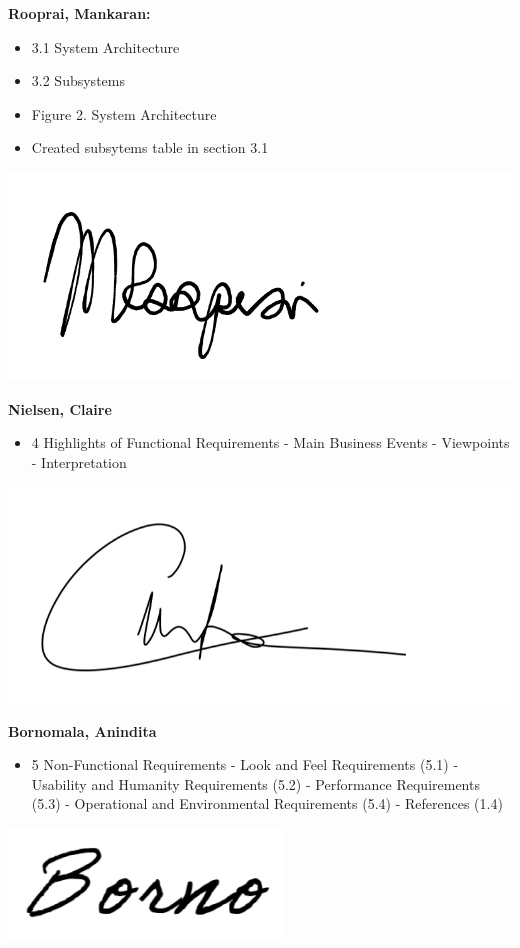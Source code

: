 \documentclass[]{article}
\begin{document}
\textbf{Rooprai, Mankaran:}
\begin{itemize}
	\item 3.1 System Architecture
	\item 3.2 Subsystems
	\item Figure 2. System Architecture
	\item Created subsytems table in section 3.1
\end{itemize}
\includegraphics[scale=0.15]{mankaransignature.png}

\textbf{Nielsen, Claire}
\begin{itemize}
        \item 4 Highlights of Functional Requirements
            \subitem - Main Business Events
            \subitem - Viewpoints
            \subitem - Interpretation
\end{itemize}
\includegraphics[scale=0.15]{clairesignature.jpg}

\textbf{Bornomala, Anindita}
\begin{itemize}
        \item 5 Non-Functional Requirements
            \subitem - Look and Feel Requirements (5.1)
            \subitem - Usability and Humanity Requirements (5.2)
            \subitem - Performance Requirements (5.3)
            \subitem - Operational and Environmental Requirements (5.4)
            \subitem - References (1.4)
\end{itemize}
\includegraphics[scale=0.50]{bornosignature.png}
\end{document}
